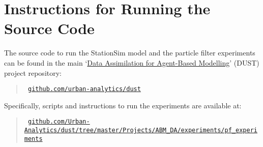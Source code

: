 \section{Instructions for Running the Source Code\label{appendix:code}}

The source code to run the StationSim model and the particle filter experiments can be found in the main `\href{https://dust.leeds.ac.uk/}{Data Assimilation for Agent-Based Modelling}' (DUST) project repository:
\begin{quote}
    \texttt{
        \href{https://github.com/urban-analytics/dust}
        {github.com/urban-analytics/dust}
    }
\end{quote}

Specifically, scripts and instructions to run the experiments are available at: 
\begin{quote}
    \texttt{
        \href{https://github.com/Urban-Analytics/dust/tree/master/Projects/ABM_DA/experiments/pf_experiments}
        {github.com/Urban-Analytics/dust/tree/master/Projects/ABM\_DA/experiments/pf\_experiments}
    }
\end{quote}
